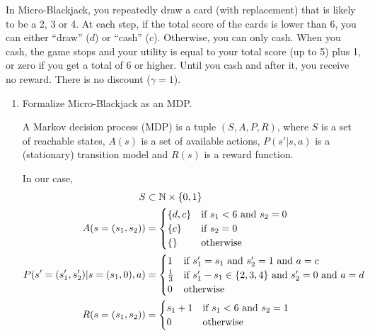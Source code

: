 \documentclass[11pt, a4paper]{article}
\begin{document}
In Micro-Blackjack, you repeatedly draw a card (with replacement) that is likely to be a 2, 3 or 4. At each step, if the total score of the cards is lower than 6, you can either \enquote{draw} ($d$) or \enquote{cash} ($c$). Otherwise, you can only cash. When you cash, the game stops and your utility is equal to your total score (up to 5) plus 1, or zero if you get a total of 6 or higher. Until you cash and after it, you receive no reward. There is no discount ($\gamma = 1$).

\begin{enumerate}
    \item Formalize Micro-Blackjack as an MDP.

    \begin{solution}
        A Markov decision process (MDP) is a tuple $(S, A, P, R)$, where $S$ is a set of reachable states, $A(s)$ is a set of available actions, $P(s' | s, a)$ is a (stationary) transition model and $R(s)$ is a reward function.

        In our case,
        \begin{align*}
            S & \subset \mathbb{N} \times \{0, 1\} \\
            A(s = (s_1, s_2)) & = \begin{cases}
                \{d, c\} & \text{if } s_1 < 6 \text{ and } s_2 = 0 \\
                \{c\} & \text{if } s_2 = 0 \\
                \{\} & \text{otherwise}
            \end{cases} \\
            P(s' = (s_1', s_2') | s = (s_1, 0), a) & = \begin{cases}
                1 & \text{if } s_1' = s_1 \text{ and } s_2' = 1 \text{ and } a = c \\
                \frac{1}{3} & \text{if } s_1' - s_1 \in \{2, 3, 4\} \text{ and } s_2' = 0 \text{ and } a = d \\
                0 & \text{otherwise}
            \end{cases} \\
            R(s = (s_1, s_2)) & = \begin{cases}
                s_1 + 1 & \text{if } s_1 < 6 \text{ and } s_2 = 1 \\
                0 & \text{otherwise}
            \end{cases}
        \end{align*}
    \end{solution}


\end{enumerate}
\end{document}

